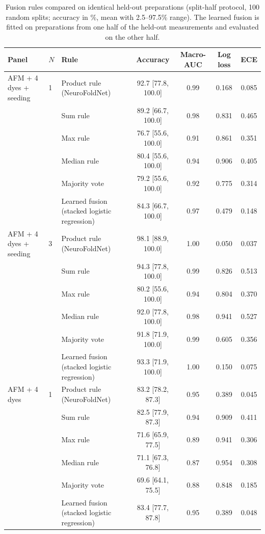 \begin{table}[!htbp]
\centering\scriptsize
\caption{Fusion rules compared on identical held-out preparations (split-half protocol, 100 random splits; accuracy in \%, mean with 2.5--97.5\% range). The learned fusion is fitted on preparations from one half of the held-out measurements and evaluated on the other half.}\label{tab:s_rules}
\begin{tabular}{llp{4.2cm}cccc}
\toprule
\textbf{Panel} & \textbf{$N$} & \textbf{Rule} & \textbf{Accuracy} & \textbf{Macro-AUC} & \textbf{Log loss} & \textbf{ECE} \\
\midrule
AFM + 4 dyes + seeding & 1 & Product rule (NeuroFoldNet) & 92.7 [77.8, 100.0] & 0.99 & 0.168 & 0.085 \\
 &  & Sum rule & 89.2 [66.7, 100.0] & 0.98 & 0.831 & 0.465 \\
 &  & Max rule & 76.7 [55.6, 100.0] & 0.91 & 0.861 & 0.351 \\
 &  & Median rule & 80.4 [55.6, 100.0] & 0.94 & 0.906 & 0.405 \\
 &  & Majority vote & 79.2 [55.6, 100.0] & 0.92 & 0.775 & 0.314 \\
 &  & Learned fusion (stacked logistic regression) & 84.3 [66.7, 100.0] & 0.97 & 0.479 & 0.148 \\
AFM + 4 dyes + seeding & 3 & Product rule (NeuroFoldNet) & 98.1 [88.9, 100.0] & 1.00 & 0.050 & 0.037 \\
 &  & Sum rule & 94.3 [77.8, 100.0] & 0.99 & 0.826 & 0.513 \\
 &  & Max rule & 80.2 [55.6, 100.0] & 0.94 & 0.804 & 0.370 \\
 &  & Median rule & 92.0 [77.8, 100.0] & 0.98 & 0.941 & 0.527 \\
 &  & Majority vote & 91.8 [71.9, 100.0] & 0.99 & 0.605 & 0.356 \\
 &  & Learned fusion (stacked logistic regression) & 93.3 [71.9, 100.0] & 1.00 & 0.150 & 0.075 \\
AFM + 4 dyes & 1 & Product rule (NeuroFoldNet) & 83.2 [78.2, 87.3] & 0.95 & 0.389 & 0.045 \\
 &  & Sum rule & 82.5 [77.9, 87.3] & 0.94 & 0.909 & 0.411 \\
 &  & Max rule & 71.6 [65.9, 77.5] & 0.89 & 0.941 & 0.306 \\
 &  & Median rule & 71.1 [67.3, 76.8] & 0.87 & 0.954 & 0.308 \\
 &  & Majority vote & 69.6 [64.1, 75.5] & 0.88 & 0.848 & 0.185 \\
 &  & Learned fusion (stacked logistic regression) & 83.4 [77.7, 87.8] & 0.95 & 0.389 & 0.048 \\

\end{tabular}
\end{table}
